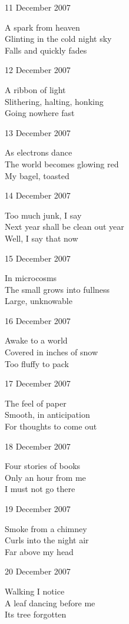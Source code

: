 \documentclass[12pt]{article}
\begin{document}
\newpage

11 December 2007

A spark from heaven \\
Glinting in the cold night sky \\
Falls and quickly fades

12 December 2007

A ribbon of light \\
Slithering, halting, honking \\
Going nowhere fast

13 December 2007

As electrons dance \\
The world becomes glowing red \\
My bagel, toasted

14 December 2007

Too much junk, I say \\
Next year shall be clean out year \\
Well, I say that now

15 December 2007

In microcosms \\
The small grows into fullness \\
Large, unknowable

16 December 2007

Awake to a world \\
Covered in inches of snow \\
Too fluffy to pack

17 December 2007

The feel of paper \\
Smooth, in anticipation \\
For thoughts to come out



\newpage

18 December 2007

Four stories of books \\
Only an hour from me \\
I must not go there

19 December 2007

Smoke from a chimney \\
Curls into the night air \\
Far above my head

20 December 2007

Walking I notice \\
A leaf dancing before me \\
Its tree forgotten
\end{document}
